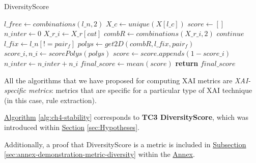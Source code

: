 \begin{algorithm}[h!]
\caption{DiversityScore}\label{alg:ch4-score-intersect}
\begin{algorithmic}[1]
    \State $l\_free \gets combinations(l\_n, 2)$
    \State $X\_c \gets unique(X[l\_c])$
    \State $score \gets []$
    \State $n\_inter \gets 0$
        \State $X\_r\_i \gets X\_r[cat]$
            \State $combR \gets combinations(X\_r\_i, 2)$
                \State $continue$
                \EndIf
                \State $l\_fix \gets l\_n[!=pair_f]$
                \State $polys \gets get2D(combR, l\_fix,pair_f)$
                \State $score\_i, n\_i \gets scorePolys(polys)$
                \State $score \gets score.appends(1 - score\_i)$
                \State $n\_inter \gets n\_inter + n\_i$
            \EndFor
        \EndIf
    \EndFor
    \State $final\_score \gets mean(score)$
    \State \textbf{return} $final\_score$
\EndProcedure
\end{algorithmic}
\end{algorithm}

All the algorithms that we have proposed for computing XAI metrics are \textit{XAI-specific metrics}: metrics that are specific for a particular type of XAI technique (in this case, rule extraction).

\hyperref[alg:ch4-stability]{Algorithm} \ref{alg:ch4-stability} corresponds to \textbf{TC3 DiversityScore}, which was introduced within \hyperref[sec:Hypotheses]{Section} \ref{sec:Hypotheses}.

Additionally, a proof that DiversityScore is a metric is included in \hyperref[sec:annex-demonstration-metric-diversity]{Subsection} \ref{sec:annex-demonstration-metric-diversity} within the \hyperref[ch:annex]{Annex}.

